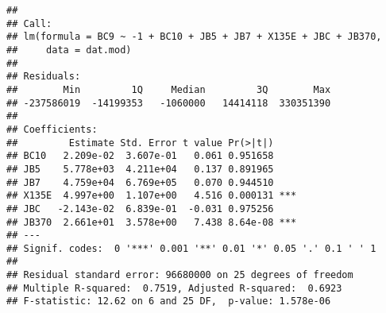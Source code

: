 \documentclass[
]{article}
\newenvironment{Shaded}{\begin{snugshade}}{\end{snugshade}}
\newcommand{\AttributeTok}[1]{\textcolor[rgb]{0.13,0.29,0.53}{#1}}
\newcommand{\CommentTok}[1]{\textcolor[rgb]{0.56,0.35,0.01}{\textit{#1}}}
\newcommand{\DecValTok}[1]{\textcolor[rgb]{0.00,0.00,0.81}{#1}}
\newcommand{\FunctionTok}[1]{\textcolor[rgb]{0.13,0.29,0.53}{\textbf{#1}}}
\newcommand{\NormalTok}[1]{#1}
\newcommand{\OtherTok}[1]{\textcolor[rgb]{0.56,0.35,0.01}{#1}}
\newcommand{\SpecialCharTok}[1]{\textcolor[rgb]{0.81,0.36,0.00}{\textbf{#1}}}
\newcommand{\StringTok}[1]{\textcolor[rgb]{0.31,0.60,0.02}{#1}}
\begin{document}
\begin{Shaded}
\end{Shaded}

\begin{verbatim}
## 
## Call:
## lm(formula = BC9 ~ -1 + BC10 + JB5 + JB7 + X135E + JBC + JB370, 
##     data = dat.mod)
## 
## Residuals:
##        Min         1Q     Median         3Q        Max 
## -237586019  -14199353   -1060000   14414118  330351390 
## 
## Coefficients:
##         Estimate Std. Error t value Pr(>|t|)    
## BC10   2.209e-02  3.607e-01   0.061 0.951658    
## JB5    5.778e+03  4.211e+04   0.137 0.891965    
## JB7    4.759e+04  6.769e+05   0.070 0.944510    
## X135E  4.997e+00  1.107e+00   4.516 0.000131 ***
## JBC   -2.143e-02  6.839e-01  -0.031 0.975256    
## JB370  2.661e+01  3.578e+00   7.438 8.64e-08 ***
## ---
## Signif. codes:  0 '***' 0.001 '**' 0.01 '*' 0.05 '.' 0.1 ' ' 1
## 
## Residual standard error: 96680000 on 25 degrees of freedom
## Multiple R-squared:  0.7519, Adjusted R-squared:  0.6923 
## F-statistic: 12.62 on 6 and 25 DF,  p-value: 1.578e-06
\end{verbatim}
\end{document}
